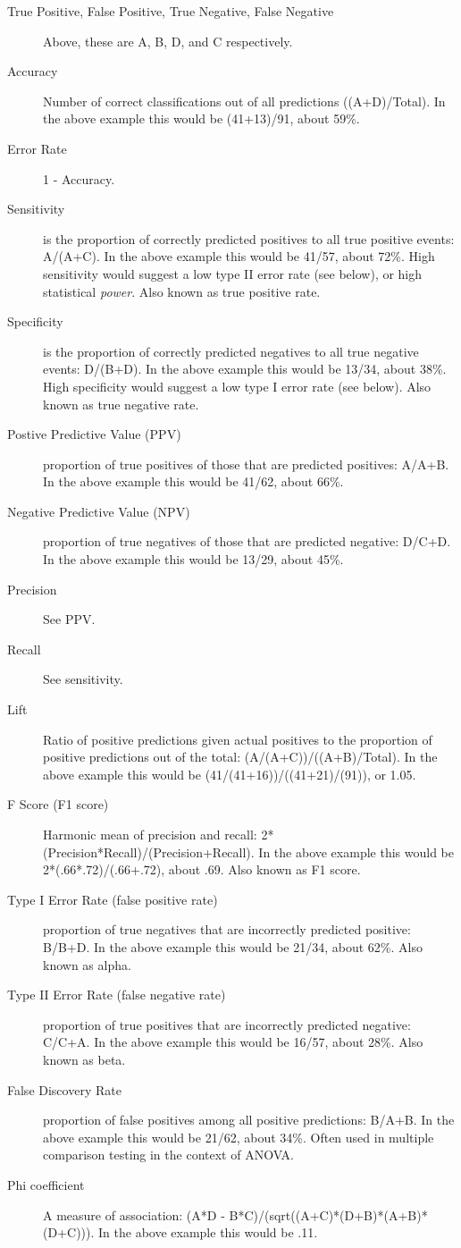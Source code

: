 \documentclass[english,nohyper,titlepage]{tufte-handout}
\begin{document}
\small
\begin{description}
  \item[True Positive, False Positive, True Negative, False Negative] Above, these are A, B, D, and C respectively.
  \item[Accuracy] Number of correct classifications out of all predictions ((A+D)/Total). In the above example this would be (41+13)/91, about 59\%.
  \item[Error Rate] 1 - Accuracy.
  \item[Sensitivity] is the proportion of correctly predicted positives to all true positive events: A/(A+C).  In the above example this would be 41/57, about 72\%. High sensitivity would suggest a low type II error rate (see below), or high statistical \emph{power}. Also known as true positive rate.
  \item[Specificity] is the proportion of correctly predicted negatives to all true negative events: D/(B+D).  In the above example this would be 13/34, about 38\%. High specificity would suggest a low type I error rate (see below). Also known as true negative rate.
  \item[Postive Predictive Value (PPV)] proportion of true positives of those that are predicted positives: A/A+B. In the above example this would be 41/62, about 66\%.
  \item[Negative Predictive Value (NPV)] proportion of true negatives of those that are predicted negative: D/C+D. In the above example this would be 13/29, about 45\%.
  \item[Precision]  See PPV.
  \item[Recall] See sensitivity. 
  \item[Lift] Ratio of positive predictions given actual positives to the proportion of positive predictions out of the total: (A/(A+C))/((A+B)/Total). In the above example this would be (41/(41+16))/((41+21)/(91)), or 1.05.
  \item[F Score (F1 score)] Harmonic mean of precision and recall: 2*(Precision*Recall)/(Precision+Recall). In the above example this would be 2*(.66*.72)/(.66+.72), about .69.  Also known as F1 score.
  \item[Type I Error Rate (false positive rate)] proportion of true negatives that are incorrectly predicted positive: B/B+D. In the above example this would be 21/34, about 62\%.  Also known as alpha.
  \item[Type II Error Rate (false negative rate)] proportion of true positives that are incorrectly predicted negative: C/C+A. In the above example this would be 16/57, about 28\%. Also known as beta.
  \item[False Discovery Rate] proportion of false positives among all positive predictions: B/A+B. In the above example this would be 21/62, about 34\%.  Often used in multiple comparison testing in the context of ANOVA.
  \item[Phi coefficient] A measure of association: (A*D - B*C)/(sqrt((A+C)*(D+B)*(A+B)*(D+C))).  In the above example this would be .11.
\end{description}
\normalsize
\end{document}
